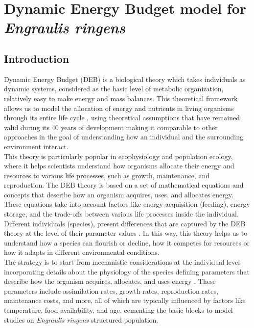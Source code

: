 \chapter{Dynamic Energy Budget model for \textit{Engraulis ringens}}\label{Chap4}

\section{Introduction}\label{Chap4Intro}

Dynamic Energy Budget (DEB) is a biological theory which takes individuals as dynamic systems, considered as the basic level of metabolic organization, relatively easy to make energy and mass balances. This theoretical framework allows us to model the allocation of energy and nutrients in living organisms through its entire life cycle \citep{Kooi2009}, using theoretical assumptions that have remained valid during its 40 years of development \citep{Kooi2020} making it comparable to other approaches in the goal of understanding how an individual and the surrounding environment interact.\\

This theory is particularly popular in ecophysiology and population ecology, where it helps scientists understand how organisms allocate their energy and resources to various life processes, such as growth, maintenance, and reproduction. The DEB theory is based on a set of mathematical equations and concepts that describe how an organism acquires, uses, and allocates energy. These equations take into account factors like energy acquisition (feeding), energy storage, and the trade-offs between various life processes inside the individual. Different individuals (species), present differences that are captured by the DEB theory at the level of their parameter values \citep{Meer2006}. In this way, this theory helps us to understand how a species can flourish or decline, how it competes for resources or how it adapts in different environmental conditions.\\

The strategy is to start from mechanistic considerations at the individual level incorporating details about the physiology of the species defining parameters that describe how the organism acquires, allocates, and uses energy \citep{KooiSabe1986}. These parameters include assimilation rates, growth rates, reproduction rates, maintenance costs, and more, all of which are typically influenced by factors like temperature, food availability, and age, cementing the basic blocks to model studies on \textit{Engraulis ringens} structured population.\\

